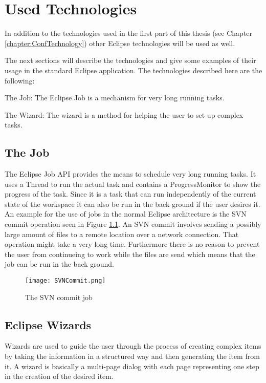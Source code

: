 \chapter{Used Technologies}
\label{chapter:AutoTechnologies}
In addition to the technologies used in the first part of this
thesis (see Chapter \ref{chapter:ConfTechnology}) other Eclipse
technologies will be used as well.

The next sections will describe the technologies and give some
examples of their usage in the standard Eclipse application.
The technologies described here are the following:
\begin{description}
 \item The Job: The Eclipse Job is a mechanism for very long running tasks.
 \item The Wizard: The wizard is a method for helping the user to set up complex tasks.
\end{description}

\section{The Job}
\label{section:AutoTechJob}
The Eclipse Job \ac{API} provides the means to schedule very long running tasks.
It uses a Thread to run the actual task and contains a ProgressMonitor to show
the progress of the task. Since it is a task that can run independently of the
current state of the workspace it can also be run in the back ground if the user
desires it.
An example for the use of jobs in the normal Eclipse architecture
is the \ac{SVN} commit operation seen in Figure \ref{fig:SVNCommit}. An \ac{SVN} commit involves
sending a possibly large amount of files to a remote location over a network connection. That
operation might take a very long time. Furthermore there is no reason to prevent the user from
continueing to work while the files are send which means that the job can be run in the back ground.
\begin{figure}
  \centering
  \texttt{[image: SVNCommit.png]}
  \caption[The SVN commit job]%
  {The SVN commit job\protect}
  \label{fig:SVNCommit}
\end{figure}

\section{Eclipse Wizards}
\label{section:AutoTechWizards}
Wizards are used to guide the user through the process of creating complex items by taking
the information in a structured way and then generating the item from it. A wizard is 
basically a multi-page dialog with each page representing one step in the creation of the 
desired item.


